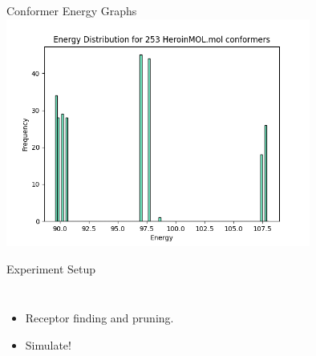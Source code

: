 \documentclass[aspectratio=169]{beamer}
\begin{document}
\begin{frame}{Conformer Energy Graphs}
\includegraphics[width=10cm]{img/Graphs/HeroinMOL_Energy_Histogram.png}
\end{frame}

\begin{frame}{Experiment Setup}
    \begin{columns}
            \begin{itemize}
            \item Receptor finding and pruning.
            \item Simulate!
      \end{itemize}
    \end{columns}
\end{frame}

\end{document}
